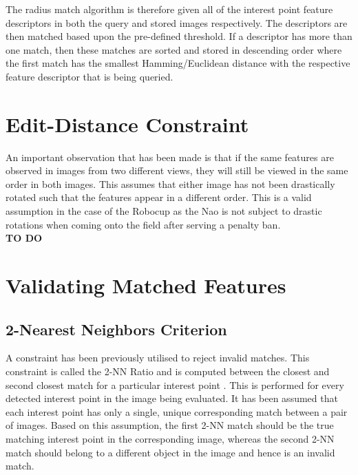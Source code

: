 \documentclass{report}
\begin{document}
The radius match algorithm is therefore given all of the interest point feature descriptors in both the query and stored images respectively. The descriptors are then matched based upon the pre-defined threshold. If a descriptor has more than one match, then these matches are sorted and stored in descending order where the first match has the smallest Hamming/Euclidean distance with the respective feature descriptor that is being queried.\\ 

\section{Edit-Distance Constraint}
\label{sec:editDistance}
An important observation that has been made is that if the same features are observed in images from two different views, they will still be viewed in the same order in both images. This assumes that either image has not been drastically rotated such that the features appear in a different order. This is a valid assumption in the case of the Robocup as the Nao is not subject to drastic rotations when coming onto the field after serving a penalty ban.\\

\textbf{TO DO}
%


\section{Validating Matched Features}
\label{sec:validation}

\subsection{2-Nearest Neighbors Criterion}
\label{sec:2nnMatching}
A constraint has been previously utilised to reject invalid matches. This constraint is called the 2-NN Ratio and is computed between the closest and second closest match for a particular interest point \cite{Lowe2004}. This is performed for every detected interest point in the image being evaluated. It has been assumed that each interest point has only a single, unique corresponding match between a pair of images. Based on this assumption, the first 2-NN match should be the true matching interest point in the corresponding image, whereas the second 2-NN match should belong to a different object in the image and hence is an invalid match.\\
\end{document}
